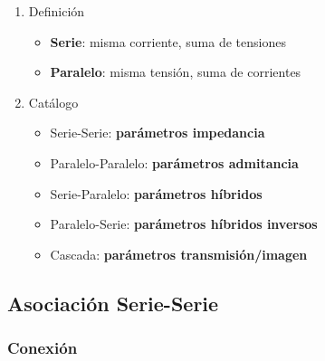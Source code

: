 \begin{enumerate}
\item Definición
\label{sec:org531ded7}
\begin{itemize}
\item \textbf{Serie}: misma corriente, suma de tensiones
\item \textbf{Paralelo}: misma tensión, suma de corrientes
\end{itemize}
\item Catálogo
\label{sec:org94028dc}
\begin{itemize}
\item Serie-Serie: \textbf{parámetros impedancia}
\item Paralelo-Paralelo: \textbf{parámetros admitancia}
\item Serie-Paralelo: \textbf{parámetros híbridos}
\item Paralelo-Serie: \textbf{parámetros híbridos inversos}
\item Cascada: \textbf{parámetros transmisión/imagen}
\end{itemize}
\end{enumerate}
\subsection{Asociación Serie-Serie}
\label{sec:orgf8c64c4}

\subsubsection{Conexión}
\label{sec:org93220a5}

